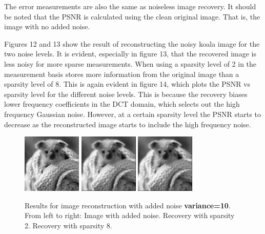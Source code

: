 \documentclass{article}
\begin{document}
The error measurements are also the same as noiseless image recovery.
It should be noted that the PSNR is calculated using the clean original image.
That is, the image with no added noise.


Figures 12 and 13 show the result of reconstructing the noisy koala image for the two noise levels.
It is evident, especially in figure 13, that the recovered image is less noisy for more sparse measurements.
When using a sparsity level of 2 in the measurement basis stores more information from the original image than a sparsity level of 8.
This is again evident in figure 14, which plots the PSNR vs sparsity level for the different noise levels.
This is because the recovery biases lower frequency coefficients in the DCT domain, which selects out the high frequency Gaussian noise.
However, at a certain sparsity level the PSNR starts to decrease as the reconstructed image starts to include the high frequency noise.


\begin{figure}[H]
    \captionsetup{width=.75\linewidth}
    \centering
        \includegraphics[width=0.25\textwidth]{images/koala_noise-10.png}
        \includegraphics[width=0.25\textwidth]{images/koala_noise-10-recovered_02.png}
        \includegraphics[width=0.25\textwidth]{images/koala_noise-10-recovered_08.png}
        \caption{Results for image reconstruction with added noise {\bf variance=10}. From left to right: Image with added noise. Recovery with sparsity 2. Recovery with sparsity 8.}
\end{figure}
\end{document}
